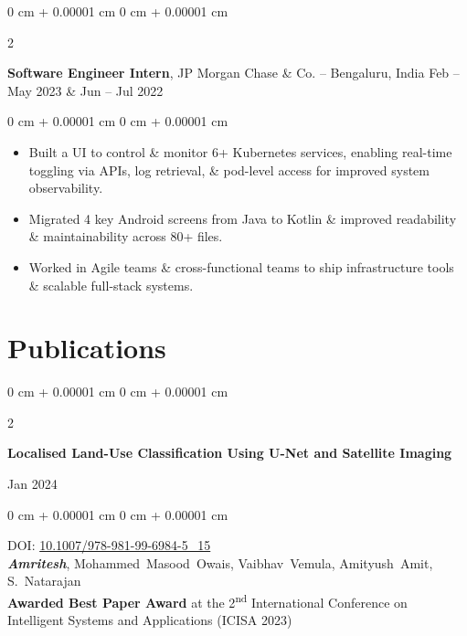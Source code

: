 \documentclass[10pt, a4paper]{article}
\newenvironment{highlights}{
    \begin{itemize}[
        topsep=0.10 cm,
        parsep=0.10 cm,
        partopsep=0pt,
        itemsep=0pt,
        leftmargin=0 cm + 10pt
    ]
}{
    \end{itemize}
} %
\newenvironment{onecolentry}{
    \begin{adjustwidth}{
        0 cm + 0.00001 cm
    }{
        0 cm + 0.00001 cm
    }
}{
    \end{adjustwidth}
} %
\newenvironment{twocolentry}[2][]{
    \onecolentry
    \def\secondColumn{#2}
    \setcolumnwidth{\fill, 6.0 cm}
    \begin{paracol}{2}
}{
    \switchcolumn \raggedleft \secondColumn
    \end{paracol}
    \endonecolentry
} %
\begin{document}
        \begin{twocolentry}{
            Feb – May 2023 \& Jun – Jul 2022
        }
            \textbf{Software Engineer Intern}, JP Morgan Chase \& Co. -- Bengaluru, India\end{twocolentry}

        \vspace{0.10 cm}
        \begin{onecolentry}
            \begin{highlights}
                \item Built a UI to control \& monitor 6+ Kubernetes services, enabling real-time toggling via APIs, log retrieval, \& pod-level access for improved system observability.
                \item Migrated 4 key Android screens from Java to Kotlin \& improved readability \& maintainability across 80+ files.
                \item Worked in Agile teams \& cross-functional teams to ship infrastructure tools \& scalable full-stack systems.
            \end{highlights}
        \end{onecolentry}
    
    \section{Publications}
        \begin{samepage}
            \begin{twocolentry}{
                Jan 2024
            }
                \textbf{Localised Land-Use Classification Using U-Net and Satellite Imaging}
            \end{twocolentry}

            \vspace{0.10 cm}
            
            \begin{onecolentry}
                DOI: \href{https://doi.org/10.1007/978-981-99-6984-5_15}{10.1007/978-981-99-6984-5\_15}\\
                \mbox{\textbf{\textit{Amritesh}}}, \mbox{Mohammed Masood Owais}, \mbox{Vaibhav Vemula},  \mbox{Amityush Amit},  \mbox{S. Natarajan}  \\
                \textbf{Awarded Best Paper Award} at the 2\textsuperscript{nd} International Conference on Intelligent Systems and Applications (ICISA 2023)

        \end{onecolentry}
        \end{samepage}
\end{document}
